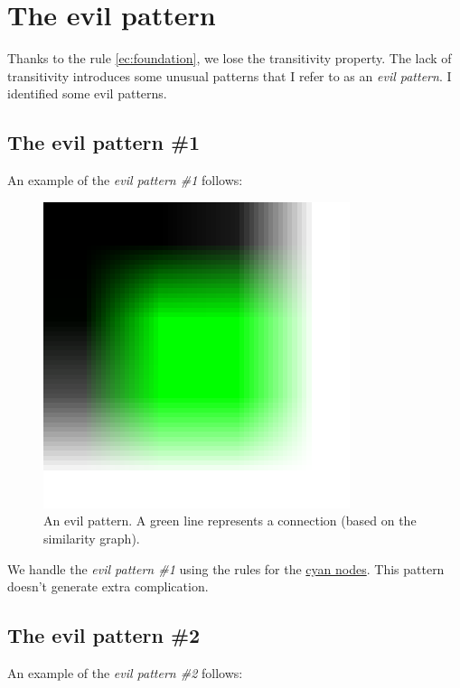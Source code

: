 \section{The evil pattern}

Thanks to the rule \ref{ec:foundation}, we lose the transitivity property. The
lack of transitivity introduces some unusual patterns that I refer to as an
\emph{evil pattern}. I identified some evil patterns.

\subsection{The evil pattern \#1}

An example of the \emph{evil pattern \#1} follows:

\begin{figure}[H]
  \centering
  \includegraphics[width=0.8\textwidth]{assets/evil_pattern.pdf}
  \caption{An evil pattern. A green line represents a connection (based on the
    similarity graph).}
\end{figure}

We handle the \emph{evil pattern \#1} using the rules for the
\hyperref[cyan_nodes]{cyan nodes}. This pattern doesn't generate extra
complication.

\subsection{The evil pattern \#2}
\label{evil_pattern2}

An example of the \emph{evil pattern \#2} follows:

